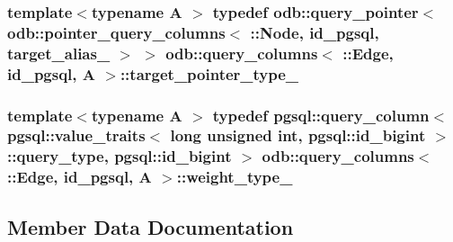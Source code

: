 \subsubsection[{target\+\_\+pointer\+\_\+type\+\_\+}]{\setlength{\rightskip}{0pt plus 5cm}template$<$typename A $>$ typedef odb\+::query\+\_\+pointer$<$ odb\+::pointer\+\_\+query\+\_\+columns$<$ \+::{\bf Node}, id\+\_\+pgsql, {\bf target\+\_\+alias\+\_\+} $>$ $>$ odb\+::query\+\_\+columns$<$ \+::{\bf Edge}, id\+\_\+pgsql, A $>$\+::{\bf target\+\_\+pointer\+\_\+type\+\_\+}}\label{structodb_1_1query__columns_3_01_1_1_edge_00_01id__pgsql_00_01_a_01_4_a514ebc8051388738a437107b5cb4038f}
\hypertarget{structodb_1_1query__columns_3_01_1_1_edge_00_01id__pgsql_00_01_a_01_4_a9e045ab1b1f5c314f9a4620e1f50a210}{}
\subsubsection[{weight\+\_\+type\+\_\+}]{\setlength{\rightskip}{0pt plus 5cm}template$<$typename A $>$ typedef pgsql\+::query\+\_\+column$<$ pgsql\+::value\+\_\+traits$<$ long unsigned int, pgsql\+::id\+\_\+bigint $>$\+::query\+\_\+type, pgsql\+::id\+\_\+bigint $>$ odb\+::query\+\_\+columns$<$ \+::{\bf Edge}, id\+\_\+pgsql, A $>$\+::{\bf weight\+\_\+type\+\_\+}}\label{structodb_1_1query__columns_3_01_1_1_edge_00_01id__pgsql_00_01_a_01_4_a9e045ab1b1f5c314f9a4620e1f50a210}


\subsection{Member Data Documentation}
\hypertarget{structodb_1_1query__columns_3_01_1_1_edge_00_01id__pgsql_00_01_a_01_4_ad4b1e3d63508cff38424ce9b9ffa2544}{}
